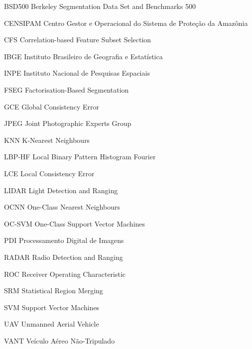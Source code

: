 \tableofcontents*
\clearpage

\listoffigures
\clearpage

\listoftables
\clearpage

\begin{siglas}
	\item[BSD500] Berkeley Segmentation Data Set and Benchmarks 500
	\item[CENSIPAM] Centro Gestor e Operacional do Sistema de Proteção da Amazônia
	\item[CFS] Correlation-based Feature Subset Selection
	\item[IBGE] Instituto Brasileiro de Geografia e Estatística
	\item[INPE] Instituto Nacional de Pesquisas Espaciais
	\item[FSEG] Factorisation-Based Segmentation
	\item[GCE] Global Consistency Error
	\item[JPEG] Joint Photographic Experts Group
	\item[KNN] K-Nearest Neighbours
	\item[LBP-HF] Local Binary Pattern Histogram Fourier
	\item[LCE] Local Consistency Error
	\item[LIDAR] Light Detection and Ranging
	\item[OCNN] One-Class Nearest Neighbours
	\item[OC-SVM] One-Class Support Vector Machines
	\item[PDI] Processamento Digital de Imagens
	\item[RADAR] Radio Detection and Ranging
	\item[ROC] Receiver Operating Characteristic
	\item[SRM] Statistical Region Merging
	\item[SVM] Support Vector Machines
	\item[UAV] Unmanned Aerial Vehicle
	\item[VANT] Veículo Aéreo Não-Tripulado
\end{siglas}



